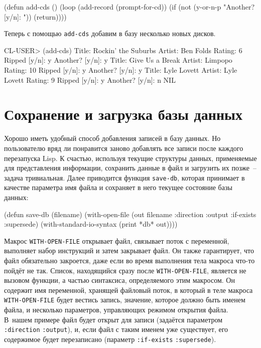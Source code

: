 \begin{myverb}
(defun add-cds ()
  (loop (add-record (prompt-for-cd))
      (if (not (y-or-n-p "Another? [y/n]: ")) (return))))
\end{myverb}

Теперь с помощью \lstinline{add-cds} добавим в базу несколько новых дисков.

\begin{myverb}
CL-USER> (add-cds)
Title: Rockin' the Suburbs
Artist: Ben Folds
Rating: 6
Ripped  [y/n]: y
Another?  [y/n]: y
Title: Give Us a Break
Artist: Limpopo
Rating: 10
Ripped  [y/n]: y
Another?  [y/n]: y
Title: Lyle Lovett
Artist: Lyle Lovett
Rating: 9
Ripped  [y/n]: y
Another?  [y/n]: n
NIL
\end{myverb}

\section{Сохранение и загрузка базы данных}

Хорошо иметь удобный способ добавления записей в базу данных. Но пользователю вряд ли
понравится заново добавлять все записи после каждого перезапуска Lisp. К счастью,
используя текущие структуры данных, применяемые для представления информации, сохранить
данные в файл и загрузить их позже~-- задача тривиальная. Далее приводится функция
\lstinline{save-db}, которая принимает в качестве параметра имя файла и сохраняет в него
текущее состояние базы данных:

\begin{myverb}
(defun save-db (filename)
  (with-open-file (out filename
                   :direction :output
                   :if-exists :supersede)
    (with-standard-io-syntax
      (print *db* out))))
\end{myverb}

Макрос \lstinline{WITH-OPEN-FILE} открывает файл, связывает поток с переменной, выполняет
набор инструкций и затем закрывает файл. Он также гарантирует, что файл обязательно
закроется, даже если во время выполнения тела макроса что-то пойдёт не так. Список,
находящийся сразу после \lstinline{WITH-OPEN-FILE}, является не вызовом функции, а частью
синтаксиса, определяемого этим макросом. Он содержит имя переменной, хранящей файловый
поток, в который в теле макроса \lstinline{WITH-OPEN-FILE} будет вестись запись, значение,
которое должно быть именем файла, и несколько параметров, управляющих режимом открытия
файла. В~нашем примере файл будет открыт для записи (задаётся параметром \lstinline{:direction}
\lstinline{:output}), и, если файл с таким именем уже существует, его содержимое будет
перезаписано (параметр \lstinline{:if-exists} \lstinline{:supersede}).

